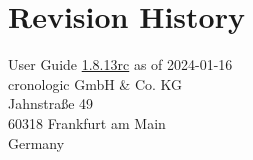 \documentclass[12pt,notitlepage,a4paper]{report}
\newcommand{\ttinput}[1]{}
\newcommand{\ttinput}[1]{}
\newcommand{\ttinput}[1]{}
\newcommand{\ugrev}{{1.8.13rc}}
\begin{document}
	\chapter{Revision History} 
		\noindent
		User Guide \hyperlink{ugrev}{\ugrev} as of 2024-01-16\\  %
		cronologic GmbH \& Co. KG\\
		Jahnstraße 49\\
		60318 Frankfurt am Main\\Germany\\
		\ttinput{FwRev.tex}
		\ifxHPTDC{}{} 
		

\end{document}
